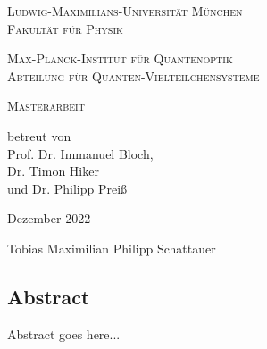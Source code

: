 \begin{titlepage}
    \vspace*{\fill}
    \centering

    \textsc{\Large Ludwig-Maximilians-Universität München}\\
    \textsc{Fakultät für Physik}

    \vspace{1cm}

    \textsc{\Large Max-Planck-Institut für Quantenoptik}\\
    \textsc{Abteilung für Quanten-Vielteilchensysteme}

    \vspace{2.3cm}

    \begin{doublespace}
        \textsc{ \Huge \titleDE}
    \end{doublespace}


    \vspace{2.3cm}
    \huge \textsc{Masterarbeit}



    \vspace{0.3cm}
    \large \textrm{betreut von\\Prof. Dr. Immanuel Bloch,\\Dr. Timon Hiker\\und Dr. Philipp Preiß}

    \vspace{1.5cm}
    \huge
    \textrm{Dezember 2022}

    \vspace{1.5cm}
    \Large \textrm{Tobias Maximilian Philipp Schattauer}

    \vspace*{\fill}
\end{titlepage}

\begin{titlepage}
    \null\vspace{3cm}
    \section*{Abstract}
    Abstract goes here...
\end{titlepage}



\tableofcontents
\newpage